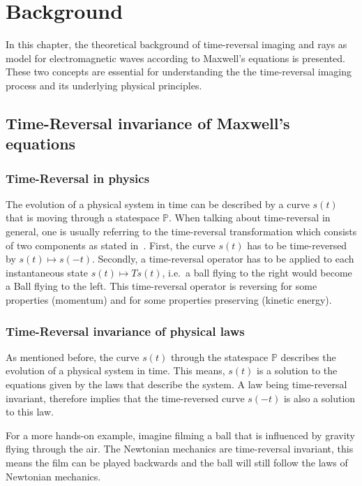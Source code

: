 
\chapter{Background}\label{chapter:background}
In this chapter, the theoretical background of time-reversal imaging and rays as model for electromagnetic waves according to Maxwell's equations is presented.
These two concepts are essential for understanding the the time-reversal imaging process and its underlying physical principles. 

\section{Time-Reversal invariance of Maxwell's equations}
\subsection{Time-Reversal in physics}
The evolution of a physical system in time can be described by a curve \(s(t)\) that is moving through a statespace \(\mathbb{P}\).
When talking about time-reversal in general, one is usually referring to the time-reversal transformation which consists of two components as stated in~\parencite{roberts_reversing_2022}.
First, the curve \(s(t)\) has to be time-reversed by \(s(t) \mapsto s(-t)\).
Secondly, a time-reversal operator has to be applied to each instantaneous state \(s(t) \mapsto Ts(t)\), i.e.\ a ball flying to the right would become a Ball flying to the left.
This time-reversal operator is reversing for some properties (momentum) and for some properties preserving (kinetic energy).

\subsection{Time-Reversal invariance of physical laws}
As mentioned before, the curve \(s(t)\) through the statespace \(\mathbb{P}\) describes the evolution of a physical system in time.
This means, \(s(t)\) is a solution to the equations given by the laws that describe the system. 
A law being time-reversal invariant, therefore implies that the time-reversed curve \(s(-t)\) is also a solution to this law.

For a more hands-on example, imagine filming a ball that is influenced by gravity flying through the air.
The Newtonian mechanics are time-reversal invariant, this means the film can be played backwards and the ball will still follow the laws of Newtonian mechanics.

